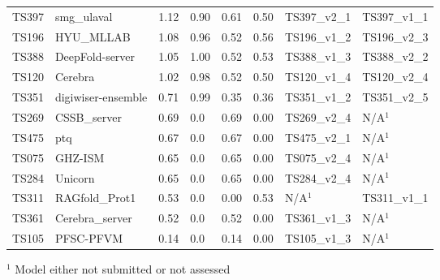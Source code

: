 \begin{table}[ht]
{\begin{tabular}{llllllll}
TS397 & smg\_ulaval & 1.12 & 0.90 & 0.61 & 0.50 & TS397\_v2\_1 & TS397\_v1\_1 \\ 
TS196 & HYU\_MLLAB & 1.08 & 0.96 & 0.52 & 0.56 & TS196\_v1\_2 & TS196\_v2\_3 \\ 
TS388 & DeepFold-server & 1.05 & 1.00 & 0.52 & 0.53 & TS388\_v1\_3 & TS388\_v2\_2 \\ 
TS120 & Cerebra & 1.02 & 0.98 & 0.52 & 0.50 & TS120\_v1\_4 & TS120\_v2\_4 \\ 
TS351 & digiwiser-ensemble & 0.71 & 0.99 & 0.35 & 0.36 & TS351\_v1\_2 & TS351\_v2\_5 \\ 
TS269 & CSSB\_server & 0.69 & 0.0 & 0.69 & 0.00 & TS269\_v2\_4 & N/A$^{1}$ \\ 
TS475 & ptq & 0.67 & 0.0 & 0.67 & 0.00 & TS475\_v2\_1 & N/A$^{1}$ \\ 
TS075 & GHZ-ISM & 0.65 & 0.0 & 0.65 & 0.00 & TS075\_v2\_4 & N/A$^{1}$ \\ 
TS284 & Unicorn & 0.65 & 0.0 & 0.65 & 0.00 & TS284\_v2\_4 & N/A$^{1}$ \\ 
TS311 & RAGfold\_Prot1 & 0.53 & 0.0 & 0.00 & 0.53 & N/A$^{1}$ & TS311\_v1\_1 \\ 
TS361 & Cerebra\_server & 0.52 & 0.0 & 0.52 & 0.00 & TS361\_v1\_3 & N/A$^{1}$ \\ 
TS105 & PFSC-PFVM & 0.14 & 0.0 & 0.14 & 0.00 & TS105\_v1\_3 & N/A$^{1}$ \\ 
\bottomrule
\end{tabular}%
}
\begin{flushleft}\footnotesize $^{1}$ Model either not submitted or not assessed\end{flushleft}
\end{table}
